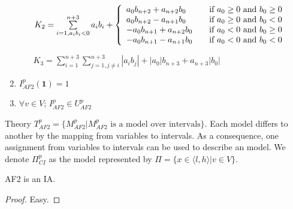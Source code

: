 \begin{enumerate}
\begin{itemize}
$K_2 = \sum\limits_{i=1,a_ib_i<0}^{n+3}a_ib_i + \left\{ 
  \begin{array}{l l}
    a_0b_{n+2} + a_{n+2}b_0 & \quad \text{if } a_0 \ge 0 \text{ and } b_0 \ge 0\\
    a_0b_{n+2} - a_{n+1}b_0 & \quad \text{if } a_0 \ge 0 \text{ and } b_0 < 0\\
    -a_0b_{n+1} + a_{n+2}b_0 & \quad \text{if } a_0 < 0 \text{ and } b_0 \ge 0\\
    -a_0b_{n+1} - a_{n+1}b_0 & \quad \text{if } a_0 < 0 \text{ and } b_0 < 0\\
  \end{array} \right.$  

$K_3 = \sum\limits_{i=1}^{n+3}\sum\limits_{j=1,j \neq i}^{n+3}|a_ib_j| + |a_0|b_{n+3} + a_{n+3}|b_0|$
\end{itemize}
\item $I^p_{AF2}(\mathbf{1}) = 1$
\item $\forall v \in V$; $I^p_{AF2} \in U^p_{AF2}$
\end{enumerate}
Theory $T^p_{AF2} = \{M^p_{AF2}| M^p_{AF2} \text{ is a model over intervals}\}$. Each model differs to another by the mapping from variables to intervals. As a consequence, one assignment from variables to intervals can be used to describe an model. We denote $\Pi^p_{CI}$ as the model represented by $\Pi = \{x \in \langle l, h\rangle  | v \in V\}$. 
\begin{theorem}
AF2 is an IA.
\end{theorem}
\begin{proof}
Easy.
\end{proof}

